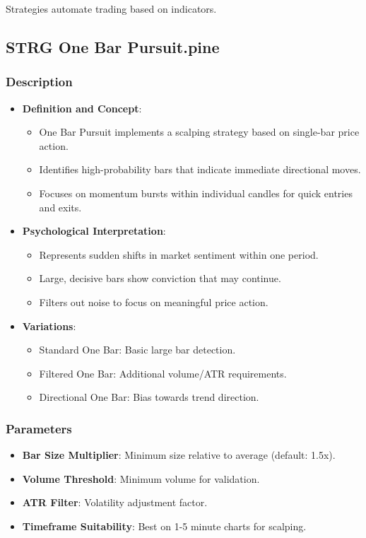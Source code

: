\documentclass[12pt]{article}
\begin{document}
Strategies automate trading based on indicators.

\subsection{STRG One Bar Pursuit.pine}
\label{subsec:onebar}

\subsubsection{Description}
\begin{itemize}
\item \textbf{Definition and Concept}:
  \begin{itemize}
  \item One Bar Pursuit implements a scalping strategy based on single-bar price action.
  \item Identifies high-probability bars that indicate immediate directional moves.
  \item Focuses on momentum bursts within individual candles for quick entries and exits.
  \end{itemize}
\item \textbf{Psychological Interpretation}:
  \begin{itemize}
  \item Represents sudden shifts in market sentiment within one period.
  \item Large, decisive bars show conviction that may continue.
  \item Filters out noise to focus on meaningful price action.
  \end{itemize}
\item \textbf{Variations}:
  \begin{itemize}
  \item Standard One Bar: Basic large bar detection.
  \item Filtered One Bar: Additional volume/ATR requirements.
  \item Directional One Bar: Bias towards trend direction.
  \end{itemize}
\end{itemize}

\subsubsection{Parameters}
\begin{itemize}
\item \textbf{Bar Size Multiplier}: Minimum size relative to average (default: 1.5x).
\item \textbf{Volume Threshold}: Minimum volume for validation.
\item \textbf{ATR Filter}: Volatility adjustment factor.
\item \textbf{Timeframe Suitability}: Best on 1-5 minute charts for scalping.
\end{itemize}
\end{document}
